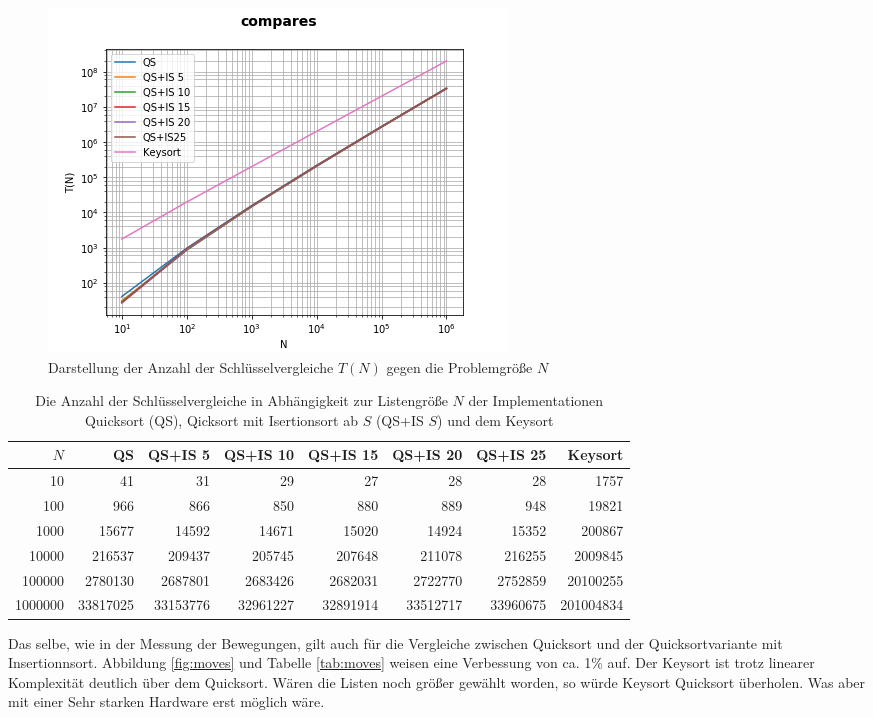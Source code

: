 \documentclass[
   draft=false
  ,paper=a4
  ,twoside=false
  ,fontsize=11pt
  ,headsepline
  ,DIV=11
  ,parskip=full+
  ,titlepage
]{scrartcl} %
\begin{document}
\begin{figure}[htp]
  \centering
  \includegraphics[width=\textwidth]{../compares.png}
  \caption[Vergleiche]{Darstellung der Anzahl der Schlüsselvergleiche 
  $T(N)$ gegen die Problemgröße $N$}
  \label{fig:compares}
\end{figure}

\begin{table}[htp]
  \centering
  \caption[Vergleiche]{Die Anzahl der Schlüsselvergleiche in Abhängigkeit 
  zur Listengröße $N$ der Implementationen Quicksort (QS),
  Qicksort mit Isertionsort ab $S$ (QS+IS $S$) und dem Keysort}
  \label{tab:compare}
  \begin{tabular}{|r|r|r|r|r|r|r|r|}
  \hline
  $N$ & QS & QS+IS 5 & QS+IS 10 & QS+IS 15 & QS+IS 20 & QS+IS 25 & Keysort \\
  \hline
  10 & 41 & 31 & 29 & 27 & 28 & 28 & 1757 \\
100 & 966 & 866 & 850 & 880 & 889 & 948 & 19821 \\
1000 & 15677 & 14592 & 14671 & 15020 & 14924 & 15352 & 200867 \\
10000 & 216537 & 209437 & 205745 & 207648 & 211078 & 216255 & 2009845 \\
100000 & 2780130 & 2687801 & 2683426 & 2682031 & 2722770 & 2752859 & 20100255 \\
1000000 & 33817025 & 33153776 & 32961227 & 32891914 & 33512717 & 33960675 & 201004834 \\
\hline
  \end{tabular}
\end{table}

Das selbe, wie in der Messung der Bewegungen, gilt auch für die Vergleiche zwischen Quicksort und der Quicksortvariante mit Insertionnsort. Abbildung \ref{fig:moves} und Tabelle \ref{tab:moves} weisen eine Verbessung von ca. 1\% auf. Der Keysort ist trotz linearer Komplexität deutlich über dem Quicksort.
Wären die Listen noch größer gewählt worden, so würde Keysort Quicksort überholen. Was aber mit einer Sehr starken Hardware erst möglich wäre.
\end{document}
